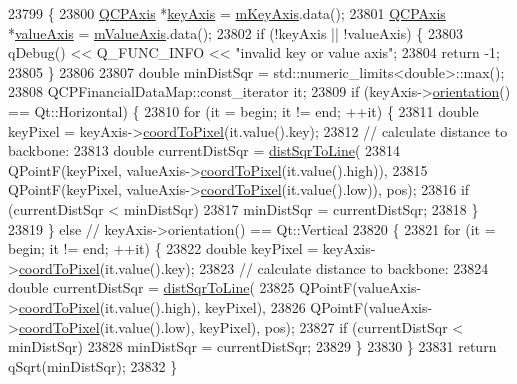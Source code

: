 \begin{DoxyCode}
23799                                                         \{
23800   \hyperlink{class_q_c_p_axis}{QCPAxis} *\hyperlink{class_q_c_p_abstract_plottable_a72c7a09c22963f2c943f07112b311103}{keyAxis} = \hyperlink{class_q_c_p_abstract_plottable_a426f42e254d0f8ce5436a868c61a6827}{mKeyAxis}.data();
23801   \hyperlink{class_q_c_p_axis}{QCPAxis} *\hyperlink{class_q_c_p_abstract_plottable_a3106f9d34d330a6097a8ec5905e5b519}{valueAxis} = \hyperlink{class_q_c_p_abstract_plottable_a2901452ca4aea911a1827717934a4bda}{mValueAxis}.data();
23802   \textcolor{keywordflow}{if} (!keyAxis || !valueAxis) \{
23803     qDebug() << Q\_FUNC\_INFO << \textcolor{stringliteral}{"invalid key or value axis"};
23804     \textcolor{keywordflow}{return} -1;
23805   \}
23806 
23807   \textcolor{keywordtype}{double} minDistSqr = std::numeric\_limits<double>::max();
23808   QCPFinancialDataMap::const\_iterator it;
23809   \textcolor{keywordflow}{if} (keyAxis->\hyperlink{class_q_c_p_axis_a57483f2f60145ddc9e63f3af53959265}{orientation}() == Qt::Horizontal) \{
23810     \textcolor{keywordflow}{for} (it = begin; it != end; ++it) \{
23811       \textcolor{keywordtype}{double} keyPixel = keyAxis->\hyperlink{class_q_c_p_axis_a985ae693b842fb0422b4390fe36d299a}{coordToPixel}(it.value().key);
23812       \textcolor{comment}{// calculate distance to backbone:}
23813       \textcolor{keywordtype}{double} currentDistSqr = \hyperlink{class_q_c_p_abstract_plottable_a5ea1cab44ca912dcdc96ed81ec5bed5d}{distSqrToLine}(
23814           QPointF(keyPixel, valueAxis->\hyperlink{class_q_c_p_axis_a985ae693b842fb0422b4390fe36d299a}{coordToPixel}(it.value().high)),
23815           QPointF(keyPixel, valueAxis->\hyperlink{class_q_c_p_axis_a985ae693b842fb0422b4390fe36d299a}{coordToPixel}(it.value().low)), pos);
23816       \textcolor{keywordflow}{if} (currentDistSqr < minDistSqr)
23817         minDistSqr = currentDistSqr;
23818     \}
23819   \} \textcolor{keywordflow}{else} \textcolor{comment}{// keyAxis->orientation() == Qt::Vertical}
23820   \{
23821     \textcolor{keywordflow}{for} (it = begin; it != end; ++it) \{
23822       \textcolor{keywordtype}{double} keyPixel = keyAxis->\hyperlink{class_q_c_p_axis_a985ae693b842fb0422b4390fe36d299a}{coordToPixel}(it.value().key);
23823       \textcolor{comment}{// calculate distance to backbone:}
23824       \textcolor{keywordtype}{double} currentDistSqr = \hyperlink{class_q_c_p_abstract_plottable_a5ea1cab44ca912dcdc96ed81ec5bed5d}{distSqrToLine}(
23825           QPointF(valueAxis->\hyperlink{class_q_c_p_axis_a985ae693b842fb0422b4390fe36d299a}{coordToPixel}(it.value().high), keyPixel),
23826           QPointF(valueAxis->\hyperlink{class_q_c_p_axis_a985ae693b842fb0422b4390fe36d299a}{coordToPixel}(it.value().low), keyPixel), pos);
23827       \textcolor{keywordflow}{if} (currentDistSqr < minDistSqr)
23828         minDistSqr = currentDistSqr;
23829     \}
23830   \}
23831   \textcolor{keywordflow}{return} qSqrt(minDistSqr);
23832 \}
\end{DoxyCode}


